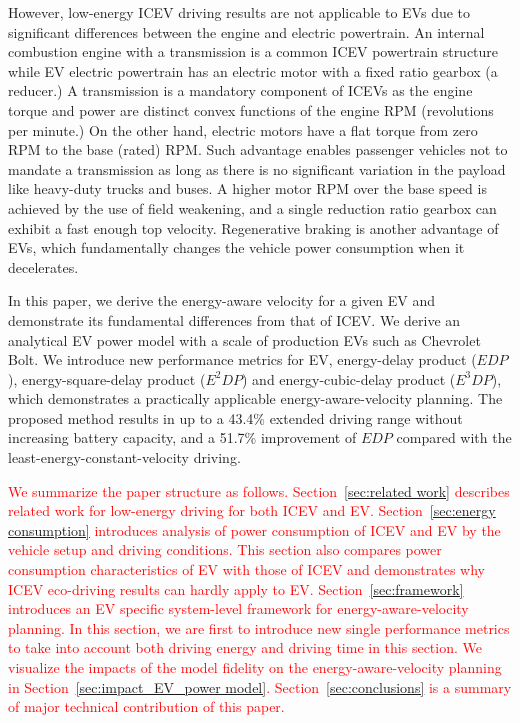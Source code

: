 \documentclass{IEEEtran}
\begin{document}
However, low-energy ICEV driving results are not applicable to EVs due to significant differences 
between the engine and electric powertrain. An internal combustion engine with a transmission is a common ICEV powertrain structure while EV electric powertrain has an electric motor with a fixed ratio gearbox (a reducer.) A transmission is a mandatory component of ICEVs as the engine torque and power are distinct convex functions of the engine RPM (revolutions per minute.) On the other hand, electric motors have a flat torque from zero RPM to the base (rated) RPM. Such advantage enables passenger vehicles not to mandate a transmission as long as there is no significant variation in the payload like heavy-duty trucks and buses. A higher motor RPM over the base speed is achieved by the use of field weakening, and a single reduction ratio gearbox can exhibit a fast enough top velocity. Regenerative braking is another advantage of EVs, which fundamentally changes the vehicle power consumption when it decelerates.

In this paper, we derive the energy-aware velocity for a given EV and demonstrate its fundamental differences from that of ICEV.
We derive an analytical EV power model with a scale of production EVs such as Chevrolet  Bolt. We introduce new performance metrics for EV, energy-delay product ($EDP$), energy-square-delay product ($E^2DP$) and energy-cubic-delay product ($E^3DP$), which demonstrates a practically applicable energy-aware-velocity planning. The proposed method results in up to a 43.4\% extended driving range without increasing battery capacity, and a 51.7\% improvement of $EDP$ compared with the least-energy-constant-velocity driving. 


\textcolor{red}{We summarize the paper structure as follows. Section~\ref{sec:related work} describes related work for low-energy driving for both ICEV and EV. Section~\ref{sec:energy consumption} introduces analysis of power consumption of ICEV and EV  by the vehicle setup and driving conditions. This section also compares power consumption characteristics of EV with those of ICEV and demonstrates why  ICEV eco-driving results can hardly apply to EV. Section~\ref{sec:framework} introduces an EV specific system-level framework for energy-aware-velocity planning. In this section, we are first to introduce new single performance metrics to take into account both driving energy and driving time in this section. We visualize the impacts of the model fidelity on the energy-aware-velocity planning in Section~\ref{sec:impact_EV_power model}. Section~\ref{sec:conclusions} is a summary of major technical contribution of this paper.}
\end{document}
